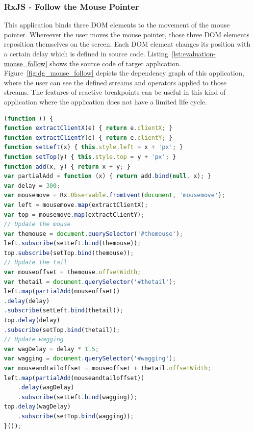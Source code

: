 \subsubsection{RxJS - Follow the Mouse Pointer}

This application binds three DOM elements to the movement of the mouse pointer. Whereever the user moves the mouse pointer, those three DOM elements reposition themselves on the screen. Each DOM element changes its position with a certain delay which is defined in source code. Listing~\ref{lst:evaluation-mouse_follow} shows the source code of target application.  Figure~\ref{fig:dg_mouse_follow} depicts the dependency graph of this application, where the user can see the defined streams and operators applied to those streams. The features of reactive breakpoints can be useful in this kind of application where the application does not have a limited life cycle. 

\begin{lstlisting}[language=JavaScript, caption=RxJS - Follow the Mouse Pointer, label={lst:evaluation-mouse_follow}]
(function () {
function extractClientX(e) { return e.clientX; }
function extractClientY(e) { return e.clientY; }
function setLeft(x) { this.style.left = x + 'px'; }
function setTop(y) { this.style.top = y + 'px'; }	
function add(x, y) { return x + y; }
var partialAdd = function (x) { return add.bind(null, x); }
var delay = 300;
var mousemove = Rx.Observable.fromEvent(document, 'mousemove');
var left = mousemove.map(extractClientX);
var top = mousemove.map(extractClientY);
// Update the mouse
var themouse = document.querySelector('#themouse');
left.subscribe(setLeft.bind(themouse));
top.subscribe(setTop.bind(themouse));
// Update the tail
var mouseoffset = themouse.offsetWidth;
var thetail = document.querySelector('#thetail');
left.map(partialAdd(mouseoffset))
.delay(delay)
.subscribe(setLeft.bind(thetail));
top.delay(delay)
.subscribe(setTop.bind(thetail));
// Update wagging
var wagDelay = delay * 1.5;
var wagging = document.querySelector('#wagging');
var mouseandtailoffset = mouseoffset + thetail.offsetWidth;
left.map(partialAdd(mouseandtailoffset))
	.delay(wagDelay)
	.subscribe(setLeft.bind(wagging));
top.delay(wagDelay)
	.subscribe(setTop.bind(wagging));
}());
\end{lstlisting}

